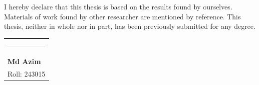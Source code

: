 I hereby declare that this thesis is based on the results found by ourselves. Materials of work found by other researcher are mentioned by reference. This thesis, neither in whole nor in part, has been previously submitted for any degree.

\vspace{1.5in}

\begin{flushright}
\begin{tabular}{@{}l@{}}
  \rule{5cm}{1pt} \\
  \textbf{Md Azim} \\
  Roll: 243015
\end{tabular}
\end{flushright}

